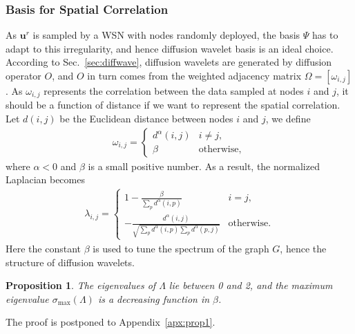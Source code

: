 \documentclass[conference]{IEEEtran}
\newtheorem{prop}{Proposition}
\begin{document}
    \subsubsection{Basis for Spatial Correlation} \label{sec:spatial}
As $\mathbf{u}^r$ is sampled by a WSN with nodes randomly deployed, the basis $\Psi$ has to adapt to this irregularity, and hence diffusion wavelet basis is an ideal choice. According to Sec.~\ref{sec:diffwave}, diffusion wavelets are generated by diffusion operator $O$, and $O$ in turn comes from the weighted adjacency matrix $\Omega=[\omega_{i,j}]$. As $\omega_{i,j}$ represents the correlation between the data sampled at nodes $i$ and $j$, it should be a function of distance if we want to represent the spatial correlation. Let $d(i,j)$ be the Euclidean distance between nodes $i$ and $j$,  we define
      \begin{eqnarray}
        \omega_{i,j} =
        \begin{cases}
          d^\alpha(i,j) & i \not= j, \\
          \beta & \mathrm{otherwise},
        \end{cases}
        \label{eq:omega}
      \end{eqnarray}
where $\alpha < 0$ and $\beta$ is a small positive number. As a result, the normalized Laplacian becomes
\begin{eqnarray}
        \lambda_{i,j} =
        \begin{cases}
          1 - \frac{\beta}{\sum_{p}{d^\alpha(i,p)}}& i=j, \\
          - \frac{d^\alpha(i,j)}{\sqrt{\sum_{p}{d^\alpha(i,p)} \sum_{p}{d^\alpha(p,j)}}} & \mathrm{otherwise}.
        \end{cases}
        \label{eq:lap+}
      \end{eqnarray}
Here the constant $\beta$ is used to tune the spectrum of the graph $G$, hence the structure of diffusion wavelets.
\begin{prop} \label{prop1}
The eigenvalues of $\Lambda$ lie between 0 and 2, and the maximum eigenvalue $\sigma_\mathrm{max}(\Lambda)$ is a decreasing function in $\beta$.
\end{prop}
The proof is postponed to Appendix~\ref{apx:prop1}.
\end{document}
